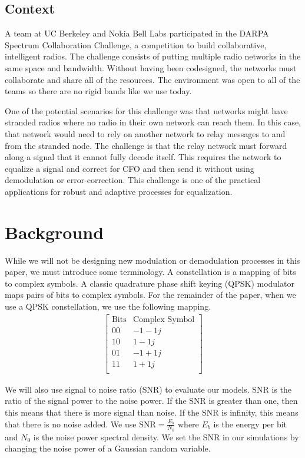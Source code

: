 \subsection{Context}

A team at UC Berkeley and Nokia Bell Labs  participated in the DARPA Spectrum Collaboration Challenge, a competition to build collaborative, intelligent radios.
The challenge consists of putting multiple radio networks in the same space and bandwidth.  
Without having been codesigned, the networks must collaborate and share all of the resources.
The environment was open to all of the teams so there are no rigid bands like we use today.

One of the potential scenarios for this challenge was that networks might have stranded radios where no radio in their own network can reach them.  In this case, that network would need to rely on another network to relay messages to and from the stranded node.  
The challenge is that the relay network must forward along a signal that it cannot fully decode itself.  This requires the network to equalize a signal and correct for CFO and then send it without using demodulation or error-correction.  
This challenge is one of the practical applications for robust and adaptive processes for equalization.

\section{Background}

While we will not be designing new modulation or demodulation processes in this paper, we must introduce some terminology.
A constellation is a mapping of bits to complex symbols.  
A classic quadrature phase shift keying (QPSK) modulator maps pairs of bits to complex symbols.
For the remainder of the paper, when we use a QPSK constellation, we use the following mapping.
\begin{align*}
\begin{bmatrix}
\text{Bits} & \text{Complex Symbol} \\
\hline
00 & -1-1j \\
10 & 1 -1j \\
01 & -1 + 1j \\
11 & 1+1j \\
\end{bmatrix}
\end{align*}

We will also use signal to noise ratio (SNR) to evaluate our models.  SNR is the ratio of the signal power to the noise power.  
If the SNR is greater than one, then this means that there is more signal than noise.  If the SNR is infinity, this means that there is no noise added.
We use $\text{SNR}=\frac{E_b}{N_0}$ where $E_b$ is the energy per bit and $N_0$ is the noise power spectral density.
We set the SNR in our simulations by changing the noise power of a Gaussian random variable. 

